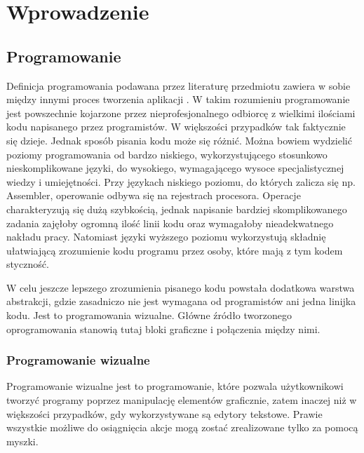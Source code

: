 \chapter{Wprowadzenie}
\label{c1}

\section{Programowanie}
\label{c11}

Definicja programowania podawana przez literaturę przedmiotu zawiera w sobie między innymi proces tworzenia aplikacji . W takim rozumieniu programowanie jest powszechnie kojarzone przez nieprofesjonalnego odbiorcę  z wielkimi ilościami kodu napisanego przez programistów. W większości przypadków tak faktycznie się dzieje. Jednak sposób pisania kodu może się różnić. Można bowiem wydzielić poziomy programowania od bardzo niskiego, wykorzystującego stosunkowo nieskomplikowane języki, do wysokiego, wymagającego wysoce specjalistycznej wiedzy i umiejętności. Przy językach niskiego poziomu, do których zalicza się np. Assembler, operowanie odbywa się na rejestrach procesora. Operacje charakteryzują się dużą szybkością, jednak napisanie bardziej skomplikowanego zadania zajęłoby ogromną ilość linii kodu oraz wymagałoby nieadekwatnego nakładu pracy. Natomiast języki wyższego poziomu wykorzystują składnię ułatwiającą zrozumienie kodu programu przez osoby, które mają z tym kodem styczność. 

W celu jeszcze lepszego zrozumienia pisanego kodu powstała dodatkowa warstwa abstrakcji, gdzie zasadniczo nie jest wymagana od programistów ani jedna linijka kodu. Jest to programowania wizualne. Główne źródło tworzonego oprogramowania stanowią tutaj bloki graficzne i połączenia między nimi. 


\subsection{Programowanie wizualne}
\label{c111}


Programowanie wizualne jest to programowanie, które pozwala użytkownikowi tworzyć programy poprzez manipulację elementów graficznie, zatem inaczej niż w większości przypadków, gdy wykorzystywane są edytory tekstowe. Prawie wszystkie możliwe do osiągnięcia akcje mogą zostać zrealizowane tylko za pomocą myszki. 

